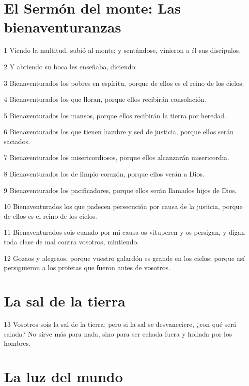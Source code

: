 \section*{El Sermón del monte: Las bienaventuranzas}

\par 1 Viendo la multitud, subió al monte; y sentándose, vinieron a él sus discípulos.
\par 2 Y abriendo su boca les enseñaba, diciendo:
\par 3 Bienaventurados los pobres en espíritu, porque de ellos es el reino de los cielos.
\par 4 Bienaventurados los que lloran, porque ellos recibirán consolación.
\par 5 Bienaventurados los mansos, porque ellos recibirán la tierra por heredad.
\par 6 Bienaventurados los que tienen hambre y sed de justicia, porque ellos serán saciados.
\par 7 Bienaventurados los misericordiosos, porque ellos alcanzarán misericordia.
\par 8 Bienaventurados los de limpio corazón, porque ellos verán a Dios.
\par 9 Bienaventurados los pacificadores, porque ellos serán llamados hijos de Dios.
\par 10 Bienaventurados los que padecen persecución por causa de la justicia, porque de ellos es el reino de los cielos.
\par 11 Bienaventurados sois cuando por mi causa os vituperen y os persigan, y digan toda clase de mal contra vosotros, mintiendo.
\par 12 Gozaos y alegraos, porque vuestro galardón es grande en los cielos; porque así persiguieron a los profetas que fueron antes de vosotros.

\section*{La sal de la tierra}

\par 13 Vosotros sois la sal de la tierra; pero si la sal se desvaneciere, ¿con qué será salada? No sirve más para nada, sino para ser echada fuera y hollada por los hombres.

\section*{La luz del mundo}

